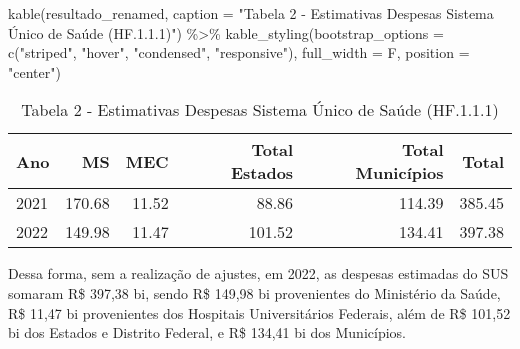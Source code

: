 \documentclass[
  letterpaper,
  DIV=11,
  numbers=noendperiod]{scrartcl}
\newenvironment{Shaded}{\begin{snugshade}}{\end{snugshade}}
\newcommand{\AttributeTok}[1]{\textcolor[rgb]{0.40,0.45,0.13}{#1}}
\newcommand{\FunctionTok}[1]{\textcolor[rgb]{0.28,0.35,0.67}{#1}}
\newcommand{\NormalTok}[1]{\textcolor[rgb]{0.00,0.23,0.31}{#1}}
\newcommand{\SpecialCharTok}[1]{\textcolor[rgb]{0.37,0.37,0.37}{#1}}
\newcommand{\StringTok}[1]{\textcolor[rgb]{0.13,0.47,0.30}{#1}}
\begin{document}
\begin{Shaded}
\begin{Highlighting}[]
\FunctionTok{kable}\NormalTok{(resultado\_renamed, }\AttributeTok{caption =} \StringTok{"Tabela 2 {-} Estimativas Despesas Sistema Único de Saúde (HF.1.1.1)"}\NormalTok{) }\SpecialCharTok{\%\textgreater{}\%}
  \FunctionTok{kable\_styling}\NormalTok{(}\AttributeTok{bootstrap\_options =} \FunctionTok{c}\NormalTok{(}\StringTok{"striped"}\NormalTok{, }\StringTok{"hover"}\NormalTok{, }\StringTok{"condensed"}\NormalTok{, }\StringTok{"responsive"}\NormalTok{), }
                \AttributeTok{full\_width =}\NormalTok{ F, }
                \AttributeTok{position =} \StringTok{"center"}\NormalTok{)}
\end{Highlighting}
\end{Shaded}

\begin{longtable}[t]{lrrrrr}
\caption{Tabela 2 - Estimativas Despesas Sistema Único de Saúde (HF.1.1.1)}\\
\toprule
Ano & MS & MEC & Total Estados & Total Municípios & Total\\
\midrule
2021 & 170.68 & 11.52 & 88.86 & 114.39 & 385.45\\
2022 & 149.98 & 11.47 & 101.52 & 134.41 & 397.38\\
\bottomrule
\end{longtable}

Dessa forma, sem a realização de ajustes, em 2022, as despesas estimadas
do SUS somaram R\$ 397,38 bi, sendo R\$ 149,98 bi provenientes do
Ministério da Saúde, R\$ 11,47 bi provenientes dos Hospitais
Universitários Federais, além de R\$ 101,52 bi dos Estados e Distrito
Federal, e R\$ 134,41 bi dos Municípios.
\end{document}
